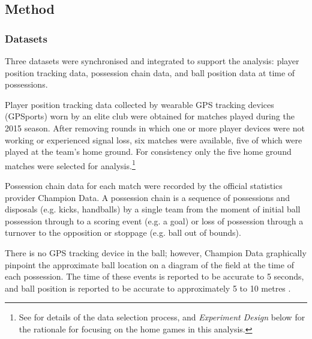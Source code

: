 

\subsection{Method}

\subsubsection{Datasets}

Three datasets were synchronised and integrated to support the analysis: player position tracking data, possession chain data, and ball position data at time of possessions.

Player position tracking data collected by wearable GPS tracking devices (GPSports) worn by an elite \afl{} club were obtained for matches played during the 2015 season. After removing rounds in which one or more player devices were not working or experienced signal loss, six matches were available, five of which were played at the team's home ground. For consistency only the five home ground matches were selected for analysis.\footnote{See  for details of the data selection process, and \textit{Experiment Design} below for the rationale for focusing on the home games in this analysis.}

Possession chain data for each match were recorded by the official \afl{} statistics provider Champion Data. A possession chain is a sequence of possessions and disposals (e.g. kicks, handballs) by a single team from the moment of initial ball possession through to a scoring event (e.g. a goal) or loss of possession through a turnover to the opposition or stoppage (e.g. ball out of bounds).

There is no GPS tracking device in the ball; however, Champion Data graphically pinpoint the approximate ball location on a diagram of the field at the time of each possession. The time of these events is reported to be accurate to 5 seconds, and ball position is reported to be accurate to approximately 5 to 10 metres \cite{oshaughnessy_possession_2006}.

